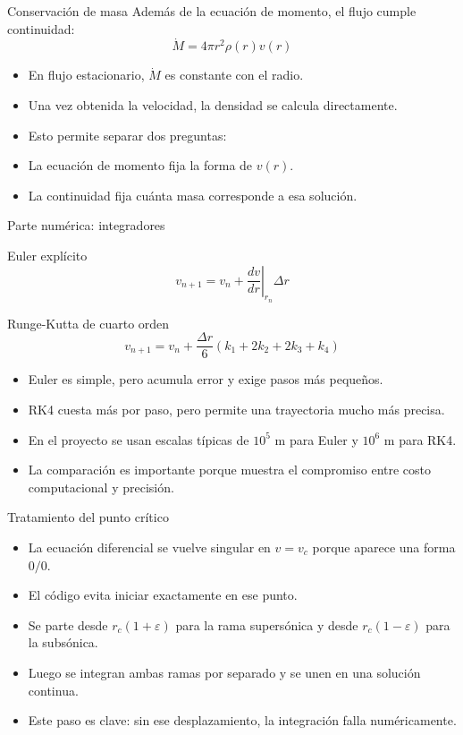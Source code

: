 \documentclass[aspectratio=169]{beamer}
\begin{document}
\begin{frame}{Conservaci\'on de masa}
  Adem\'as de la ecuaci\'on de momento, el flujo cumple continuidad:
  \[
    \dot{M} = 4\pi r^2 \rho(r) v(r)
  \]

  \begin{itemize}
    \item En flujo estacionario, $\dot{M}$ es constante con el radio.
    \item Una vez obtenida la velocidad, la densidad se calcula directamente.
    \item Esto permite separar dos preguntas:
    \item La ecuaci\'on de momento fija la forma de $v(r)$.
    \item La continuidad fija cu\'anta masa corresponde a esa soluci\'on.
  \end{itemize}
\end{frame}

\begin{frame}{Parte num\'erica: integradores}
  \begin{block}{Euler expl\'icito}
    \[
      v_{n+1} = v_n + \left.\frac{dv}{dr}\right|_{r_n}\Delta r
    \]
  \end{block}

  \begin{block}{Runge-Kutta de cuarto orden}
    \[
      v_{n+1} = v_n + \frac{\Delta r}{6}\left(k_1 + 2k_2 + 2k_3 + k_4\right)
    \]
  \end{block}

  \begin{itemize}
    \item Euler es simple, pero acumula error y exige pasos m\'as peque\~nos.
    \item RK4 cuesta m\'as por paso, pero permite una trayectoria mucho m\'as precisa.
    \item En el proyecto se usan escalas t\'ipicas de $10^5$ m para Euler y $10^6$ m para RK4.
    \item La comparaci\'on es importante porque muestra el compromiso entre costo computacional y precisi\'on.
  \end{itemize}
\end{frame}

\begin{frame}{Tratamiento del punto cr\'itico}
  \begin{itemize}
    \item La ecuaci\'on diferencial se vuelve singular en $v=v_c$ porque aparece una forma $0/0$.
    \item El c\'odigo evita iniciar exactamente en ese punto.
    \item Se parte desde $r_c(1+\varepsilon)$ para la rama supers\'onica y desde $r_c(1-\varepsilon)$ para la subs\'onica.
    \item Luego se integran ambas ramas por separado y se unen en una soluci\'on continua.
    \item Este paso es clave: sin ese desplazamiento, la integraci\'on falla num\'ericamente.
  \end{itemize}
\end{frame}
\end{document}
